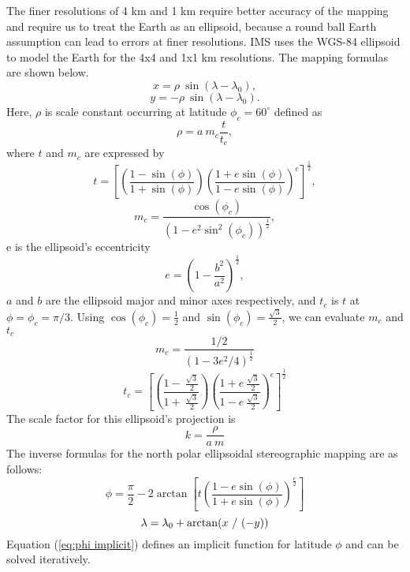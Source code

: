 The finer resolutions of 4 km and 1 km require better accuracy of the mapping and require us to treat 
the Earth as an ellipsoid, because a round ball Earth 
assumption can lead to errors at finer resolutions. IMS uses the WGS-84 ellipsoid to model the Earth for the 4x4 and 1x1 km resolutions. The mapping formulas are shown below.
\begin{equation}
x = \rho \ \sin(\lambda - \lambda_{0}),
\end{equation}
\begin{equation}
y = -\rho\ \sin(\lambda - \lambda_{0}).
\end{equation}
Here,  $\rho$ is   scale constant occurring at latitude $\phi_{c} = 60^{\circ}$ defined as
\begin{equation}
\rho = a \ m_c \frac{t}{t_c},
\end{equation}
where 
$t$ and $m_c$ are expressed by
\begin{equation}
t = \left[ \left( \frac{1 - \sin(\phi)}{1 + \sin(\phi)} \right) \left( \frac{1 + e \sin(\phi)}{1 - e \sin(\phi)} \right)^{e} \right]^\frac{1}{2},
\end{equation}
\begin{equation}
m_c = \frac{\cos(\phi_c)}{(1-e^2 \sin^2(\phi_c))^\frac{1}{2}},
\end{equation}
e is the ellipsoid's eccentricity 
\begin{equation}
e = \left( 1- \frac{b^2}{a^2} \right)^{\frac{1}{2}},
\end{equation}
$a$ and $b$ are the ellipsoid major and minor axes respectively, and
$t_c$ is  $t$ at $\phi = \phi_c=\pi/3$.
Using $\cos(\phi_c) = \frac{1}{2}$ and $\sin(\phi_c) = \frac{\sqrt{3}}{2}$, we can evaluate $m_c$ and $t_c$ 
\begin{equation}
m_c = \frac{1/2}{(1-3e^2/4)^\frac{1}{2}}
\end{equation}
\begin{equation}
t_c = \left[ \left( \frac{1 - \ \frac{\sqrt{3}}{2}}{1 + \ \frac{\sqrt{3}}{2}} \right) \left( \frac{1 + e \ \frac{\sqrt{3}}{2}}{1 - e \ \frac{\sqrt{3}}{2}} \right)^{e} \right]^\frac{1}{2}
\end{equation}
The scale factor for this ellipsoid's projection is 
\begin{equation}
k = \frac{\rho}{a \ m}
\end{equation}
The inverse formulas for the north polar ellipsoidal stereographic mapping are as follows: 
\begin{equation} \label{eq:phi implicit}
\phi = \frac{\pi}{2} - 2 \arctan \left[ t \left( \frac{1 - e \sin(\phi)}{1 + e \sin(\phi)} \right)^{\frac{e}{2}} \right]
\end{equation}
\begin{equation}
\lambda = \lambda_{0} + \arctan(x \ / \ (-y)) \\
\end{equation}
Equation (\ref{eq:phi implicit}) defines an implicit function for latitude $\phi$ and can be solved iteratively.

